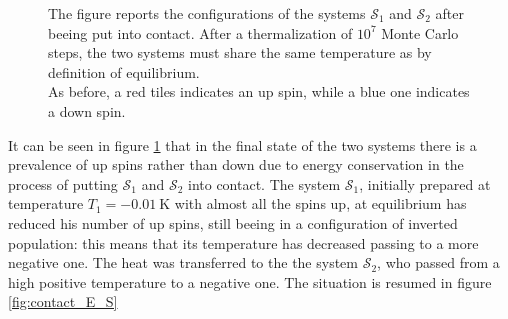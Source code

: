 \begin{figure}
\begin{minipage}[c]{0.45\textwidth}
    \end{minipage}
    \caption{The figure reports the configurations of the systems $\mathcal{S}_1$ and $\mathcal{S}_2$ after beeing put into contact. After a thermalization of $10^7$ Monte Carlo steps, the two systems must share the same temperature as by definition of equilibrium. \\
    As before, a red tiles indicates an up spin, while a blue one indicates a down spin.}
    \label{fig:contact_final}
\end{figure}
It can be seen in figure \ref{fig:contact_final} that in the final state of the two systems there is a prevalence of up spins rather than down due to energy conservation in the process of putting $\mathcal{S}_1$ and $\mathcal{S}_2$ into contact. The system $\mathcal{S}_1$, initially prepared at temperature $T_1 = \SI{-0.01}{\kelvin}$ with almost all the spins up, at equilibrium has reduced his number of up spins, still
beeing in a configuration of inverted population: this means that its temperature has decreased passing to a more negative one. The heat was transferred to the the system $\mathcal{S}_2$, who passed from a high positive temperature to a negative one. The situation is resumed in figure \ref{fig:contact_E_S}